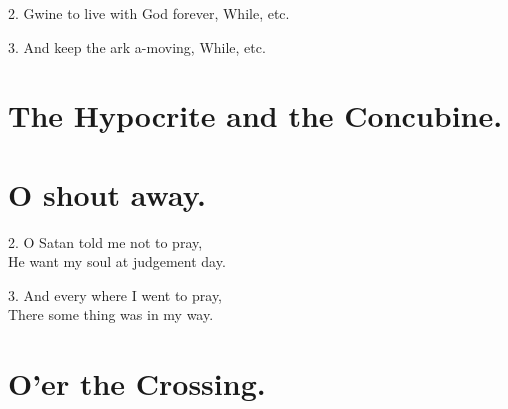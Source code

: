 \documentclass[a5paper,10pt]{book}
\begin{document}
\begin{song}
\end{song}

\begin{stanza}
\item[2.]
  Gwine to live with God forever, While, etc.
\item[3.]
  And keep the ark a-moving, While, etc.
\end{stanza}


\newpage
\section{The Hypocrite and the Concubine.}
\thispagestyle{empty}

\begin{song}
\end{song}


\newpage
\section{O shout away.}
\thispagestyle{empty}

\begin{song}
\end{song}

\begin{stanza}
\item[2.]
  O Satan told me not to pray,\\
  He want my soul at judgement day.
\item[3.]
  And every where I went to pray,\\
  There some thing was in my way.
\end{stanza}


\newpage
\section{O'er the Crossing.}
\thispagestyle{empty}

\begin{song}
\end{song}
\end{document}
